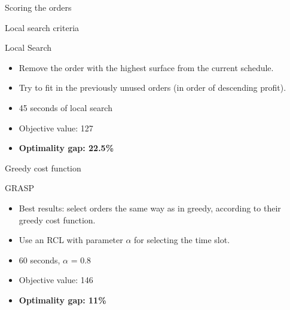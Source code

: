 \documentclass[presentation]{beamer}
\begin{document}
\begin{frame}{Scoring the orders}
\begin{figure}[H]
\centering

\end{figure}  
\end{frame}


\begin{frame}{Local search criteria}
\begin{block}{Local Search}
    \begin{itemize} 
    \item Remove the order with the highest surface from the current schedule.
    \item Try to fit in the previously unused orders (in order of descending profit). 
    \end{itemize}
    \end{block}

    \begin{itemize} 
    \item 45 seconds of local search
    \item Objective value: 127
    \item \textbf{Optimality gap: 22.5\%}
    \end{itemize}
\end{frame}

\begin{frame}{Greedy cost function}
    \begin{block}{GRASP}
    \begin{itemize}
    \item Best results: select orders the same way as in greedy, according to their greedy cost function.
    \item Use an RCL with parameter $\alpha$ for selecting the time slot.
\end{itemize}
\end{block}

    \begin{itemize}
    \item 60 seconds, $\alpha$ = 0.8
    \item Objective value: 146
    \item \textbf{Optimality gap: 11\%}
\end{itemize}

\end{frame}
\end{document}
